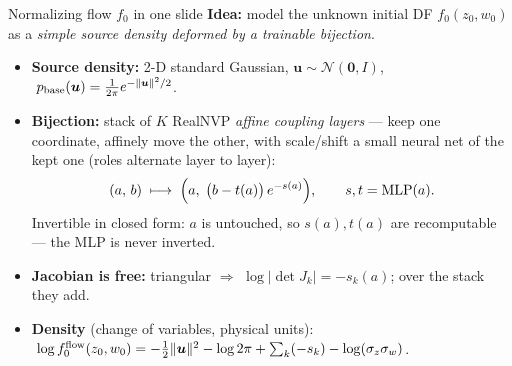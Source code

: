 \documentclass[10pt]{beamer}
\begin{document}
\begin{frame}{Normalizing flow $f_0$ in one slide}
\small
\textbf{Idea:} model the unknown initial DF $f_0(z_0,w_0)$ as a
\emph{simple source density deformed by a trainable bijection}.

\vspace{2pt}
\begin{itemize}\setlength\itemsep{2pt}
\item \textbf{Source density:} 2-D standard Gaussian,
      $\bm u \sim \mathcal N(\bm 0, I)$,
      $\;p_{\rm base}(\bm u)=\tfrac{1}{2\pi}e^{-\|\bm u\|^2/2}$.
\item \textbf{Bijection:} stack of $K$ RealNVP \emph{affine coupling layers} ---
      keep one coordinate, affinely move the other, with scale/shift a small
      neural net of the kept one (roles alternate layer to layer):
      \[
      (a,\,b)\;\longmapsto\;\Bigl(a,\;\bigl(b-t(a)\bigr)\,e^{-s(a)}\Bigr),
      \qquad s,t = \mathrm{MLP}(a).
      \]
      Invertible in closed form: $a$ is untouched, so $s(a),t(a)$ are
      recomputable --- the MLP is never inverted.
\item \textbf{Jacobian is free:} triangular $\Rightarrow$
      $\log\lvert\det J_k\rvert = -s_k(a)$; over the stack they add.
\item \textbf{Density} (change of variables, physical units):
      $\;\log f_0^{\rm flow}(z_0,w_0)=
      -\tfrac12\|\bm u\|^2-\log 2\pi
      +\sum_{k}(-s_k)-\log(\sigma_z\sigma_w)$.
\end{itemize}

\vspace{4pt}
\centering
{}

\end{frame}
\end{document}
